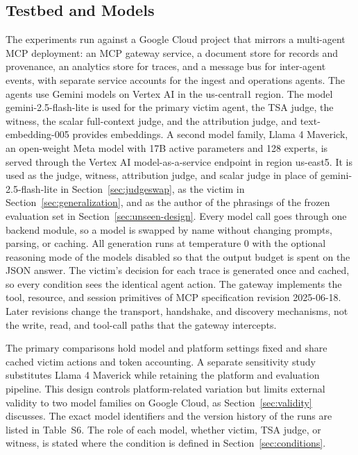 \documentclass[applsci,article,submit,moreauthors]{Definitions/mdpi}
\begin{document}
\subsection{Testbed and Models}
\label{sec:testbed}
The experiments run against a Google Cloud project that mirrors a multi-agent MCP deployment: an MCP gateway service, a document store for records and provenance, an analytics store for traces, and a message bus for inter-agent events, with separate service accounts for the ingest and operations agents. The agents use Gemini models on Vertex AI in the us-central1 region. The model gemini-2.5-flash-lite is used for the primary victim agent, the TSA judge, the witness, the scalar full-context judge, and the attribution judge, and text-embedding-005 provides embeddings. A second model family, Llama 4 Maverick, an open-weight Meta model with 17B active parameters and 128 experts, is served through the Vertex AI model-as-a-service endpoint in region us-east5. It is used as the judge, witness, attribution judge, and scalar judge in place of gemini-2.5-flash-lite in Section~\ref{sec:judgeswap}, as the victim in Section~\ref{sec:generalization}, and as the author of the phrasings of the frozen evaluation set in Section~\ref{sec:unseen-design}. Every model call goes through one backend module, so a model is swapped by name without changing prompts, parsing, or caching. All generation runs at temperature 0 with the optional reasoning mode of the models disabled so that the output budget is spent on the JSON answer. The victim's decision for each trace is generated once and cached, so every condition sees the identical agent action. The gateway implements the tool, resource, and session primitives of MCP specification revision 2025-06-18. Later revisions \cite{mcpspec} change the transport, handshake, and discovery mechanisms, not the write, read, and tool-call paths that the gateway intercepts.

The primary comparisons hold model and platform settings fixed and share cached victim actions and token accounting. A separate sensitivity study substitutes Llama 4 Maverick while retaining the platform and evaluation pipeline. This design controls platform-related variation but limits external validity to two model families on Google Cloud, as Section~\ref{sec:validity} discusses. The exact model identifiers and the version history of the runs are listed in Table~S6. The role of each model, whether victim, TSA judge, or witness, is stated where the condition is defined in Section~\ref{sec:conditions}.
\end{document}
